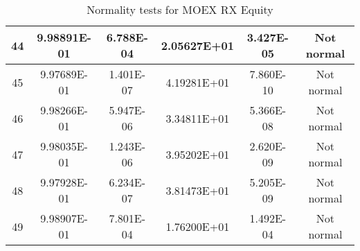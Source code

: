 \begin{table}[h]
\begin{tabular}{|c|c|c|c|c|c|}
		44 & 9.98891E-01 & 6.788E-04 & 2.05627E+01 & 3.427E-05 & Not normal\\\hline
		45 & 9.97689E-01 & 1.401E-07 & 4.19281E+01 & 7.860E-10 & Not normal\\\hline
		46 & 9.98266E-01 & 5.947E-06 & 3.34811E+01 & 5.366E-08 & Not normal\\\hline
		47 & 9.98035E-01 & 1.243E-06 & 3.95202E+01 & 2.620E-09 & Not normal\\\hline
		48 & 9.97928E-01 & 6.234E-07 & 3.81473E+01 & 5.205E-09 & Not normal\\\hline
		49 & 9.98907E-01 & 7.801E-04 & 1.76200E+01 & 1.492E-04 & Not normal\\\hline
	\end{tabular}
	\caption{Normality tests for MOEX RX Equity}
	\label{tab:normality_tests_MOEX_RX}
\end{table}
